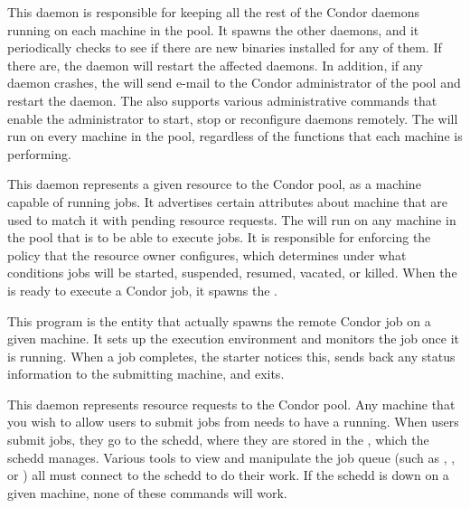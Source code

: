 \begin{description} 

\item[\Condor{master}] This daemon
is responsible for keeping all the
rest of the Condor daemons running on each machine in the pool.  It
spawns the other daemons, and it periodically checks to see if there are
new binaries installed for any of them.  If there are, the 
 daemon will
restart the affected daemons.  In addition, if any daemon crashes, the
 will send e-mail to the Condor administrator of the pool and
restart the daemon.  The  also supports various
administrative commands that enable the administrator to start, 
stop or reconfigure daemons remotely.  
The  will run on every machine in
the pool, regardless of the functions that each machine is performing.  

\item[\Condor{startd}] This daemon
represents a given resource to the Condor pool,  
as a machine capable of running jobs. 
It advertises certain attributes about machine that are used to
match it with pending resource requests.  
The  will run on any
machine in the pool that is to be able to execute jobs.  
It is responsible for enforcing the policy that the resource owner configures,
which determines under what conditions jobs will be started,
suspended, resumed, vacated, or killed.
When the  is ready to
execute a Condor job, it spawns the .

\item[\Condor{starter}] This program
is the entity that actually
spawns the remote Condor job on a given machine.  It sets up the
execution environment and monitors the job once it is running.  When a
job completes, the starter notices this, sends back any status
information to the submitting machine, and exits.

\item[\Condor{schedd}] This daemon
represents resource requests to
the Condor pool.  Any machine that you wish to allow users to submit
jobs from needs to have a  running.  When users submit
jobs, they go to the schedd, where they are stored in the , which the schedd manages.  Various tools to view and
manipulate the job queue (such as , , or
) all must connect to the schedd to do their work.  If the
schedd is down on a given machine, none of these commands will work.  


\end{description}
